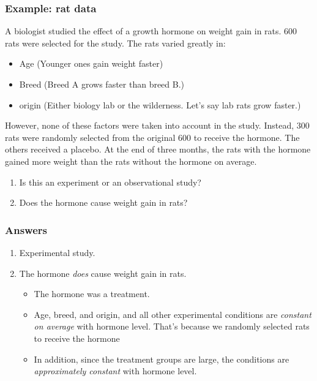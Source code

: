 \documentclass[handout]{beamer}\usepackage{graphicx, color}
\numberwithin{equation}{section}
\begin{document}
\begin{frame}
\frametitle{Example: rat data}
\small
A biologist studied the effect of a growth hormone on weight gain in rats. 600 rats were selected for the study. The rats varied greatly in:
\begin{itemize}
\pause \item Age (Younger ones gain weight faster)
\pause \item Breed (Breed A grows faster than breed B.)
\pause \item origin (Either biology lab or the wilderness. Let's say lab rats grow faster.)
\end{itemize}
\pause However, none of these factors were taken into account in the study. Instead, 300 rats were randomly selected from the original 600 to receive the hormone. The others received a placebo. \pause At the end of three months, the rats with the hormone gained more weight than the rats without the hormone on average.

\begin{enumerate}[1. ]
\pause \item Is this an experiment or an observational study?
\pause \item Does the hormone cause weight gain in rats?
\end{enumerate}
\end{frame}


\begin{frame}
\frametitle{Answers}
\begin{enumerate}[1. ]
\pause \item Experimental study.
\pause \item The hormone \emph{does} cause weight gain in rats.
\begin{itemize}
\pause \item The hormone was a treatment.
\pause \item Age, breed, and origin, and all other experimental conditions are \emph{constant on average} with hormone level. That's because we randomly selected rats to receive the hormone
\pause \item In addition, since the treatment groups are large, the conditions are \emph{approximately constant} with hormone level.
\end{itemize}
\end{enumerate}
\end{frame}

\end{document}

